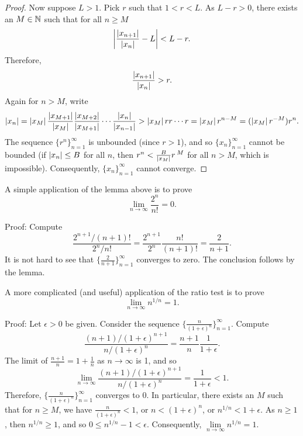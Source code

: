 \begin{proof}
Now suppose $L > 1$.  Pick
$r$ such that $1 < r < L$.  As $L-r > 0$,
there exists an $M \in {\mathbb{N}}$ such that for
all $n \geq M$
\begin{equation*}
\left\lvert {\frac{\left\lvert {x_{n+1}} \right\rvert}{\left\lvert {x_n} \right\rvert} - L} \right\rvert < L-r .
\end{equation*}
Therefore,
\begin{equation*}
\frac{\left\lvert {x_{n+1}} \right\rvert}{\left\lvert {x_n} \right\rvert} > r .
\end{equation*}
Again for $n > M$,
write
\begin{equation*}
\left\lvert {x_n} \right\rvert =
\left\lvert {x_M} \right\rvert
\frac{\left\lvert {x_{M+1}} \right\rvert}{\left\lvert {x_{M}} \right\rvert}
\frac{\left\lvert {x_{M+2}} \right\rvert}{\left\lvert {x_{M+1}} \right\rvert}
\cdots
\frac{\left\lvert {x_{n}} \right\rvert}{\left\lvert {x_{n-1}} \right\rvert}
>
\left\lvert {x_M} \right\rvert
r r \cdots r = \left\lvert {x_M} \right\rvert r^{n-M} = (\left\lvert {x_M} \right\rvert r^{-M}) r^n .
\end{equation*}
The sequence $\{ r^n \}_{n=1}^\infty$ is unbounded (since $r > 1$), and so
$\{x_n\}_{n=1}^\infty$ cannot be bounded (if $\left\lvert {x_n} \right\rvert \leq B$ for all $n$, then
$r^n < \frac{B}{\left\lvert {x_M} \right\rvert} r^{\:M}$ for all $n > M$, which is impossible).
Consequently, $\{ x_n \}_{n=1}^\infty$ cannot converge.
\end{proof}

\begin{example}
A simple application of the lemma above is to prove 
\begin{equation*}
\lim_{n\to\infty} \frac{2^n}{n!} = 0 .
\end{equation*}

Proof:
Compute
\begin{equation*}
\frac{2^{n+1} / (n+1)!}{2^n/n!}
=
\frac{2^{n+1}}{2^n}\frac{n!}{(n+1)!}
=
\frac{2}{n+1} .
\end{equation*}
It is not hard to see that $\bigl\{ \frac{2}{n+1} \bigr\}_{n=1}^\infty$ converges to zero.
The conclusion follows by the lemma.
\end{example}

\begin{example} \label{example:nto1overn}
A more complicated (and useful) application of the ratio test is to prove 
\begin{equation*}
\lim_{n\to\infty} n^{1/n} = 1 .
\end{equation*}

Proof:
Let $\epsilon > 0$ be given.  Consider the sequence
$\bigl\{ \frac{n}{{(1+\epsilon)}^n} \bigr\}_{n=1}^\infty$.  Compute
\begin{equation*}
\frac{(n+1)/{(1+\epsilon)}^{n+1}}{n/{(1+\epsilon)}^{n}}
=
\frac{n+1}{n} \frac{1}{1+\epsilon} .
\end{equation*}
The limit of $\frac{n+1}{n} = 1+\frac{1}{n}$ as $n \to \infty$ is 1, and so
\begin{equation*}
\lim_{n\to \infty} \frac{(n+1)/{(1+\epsilon)}^{n+1}}{n/{(1+\epsilon)}^{n}}
=
\frac{1}{1+\epsilon}  < 1 .
\end{equation*}
Therefore, $\bigl\{ \frac{n}{{(1+\epsilon)}^n} \bigr\}_{n=1}^\infty$ converges to 0.
In particular,
there exists an $M$ such that for $n \geq M$, we have
$\frac{n}{{(1+\epsilon)}^n} < 1$, or 
$n < {(1+\epsilon)}^n$, or 
$n^{1/n} < 1+\epsilon$.  As $n \geq 1$, then $n^{1/n} \geq 1$, and
so $0 \leq n^{1/n}-1 < \epsilon$. Consequently,
$\lim\limits_{n\to\infty} n^{1/n} = 1$.
\end{example}

